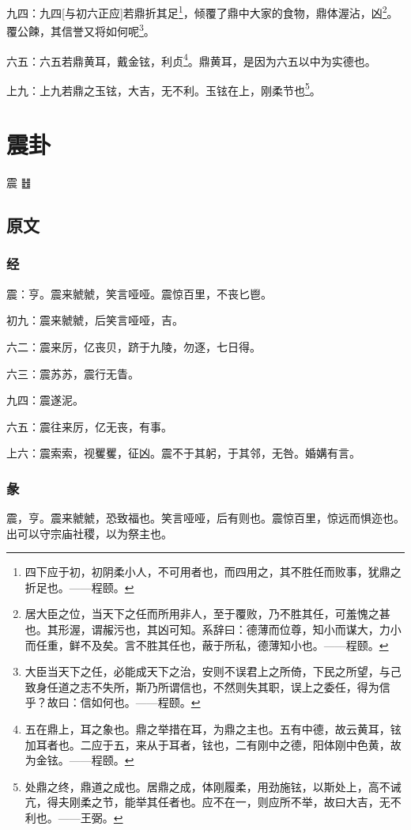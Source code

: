 \documentclass[12pt,oneside]{book}
\begin{document}
九四：九四[与初六正应]若鼎折其足\footnote{四下应于初，初阴柔小人，不可用者也，而四用之，其不胜任而败事，犹鼎之折足也。——程颐。}，倾覆了鼎中大家的食物，鼎体渥沾，凶\footnote{居大臣之位，当天下之任而所用非人，至于覆败，乃不胜其任，可羞愧之甚也。其形渥，谓赧污也，其凶可知。系辞曰：德薄而位尊，知小而谋大，力小而任重，鲜不及矣。言不胜其任也，蔽于所私，德薄知小也。——程颐。}。覆公餗，其信誉又将如何呢\footnote{大臣当天下之任，必能成天下之治，安则不误君上之所倚，下民之所望，与己致身任道之志不失所，斯乃所谓信也，不然则失其职，误上之委任，得为信乎？故曰：信如何也。——程颐。}。

六五：六五若鼎黄耳，戴金铉，利贞\footnote{五在鼎上，耳之象也。鼎之举措在耳，为鼎之主也。五有中德，故云黄耳，铉加耳者也。二应于五，来从于耳者，铉也，二有刚中之德，阳体刚中色黄，故为金铉。——程颐。}。鼎黄耳，是因为六五以中为实德也。

上九：上九若鼎之玉铉，大吉，无不利。玉铉在上，刚柔节也\footnote{处鼎之终，鼎道之成也。居鼎之成，体刚履柔，用劲施铉，以斯处上，高不诫亢，得夫刚柔之节，能举其任者也。应不在一，则应所不举，故曰大吉，无不利也。——王弼。}。




\chapter{震卦}
震 {\large ䷲}
\section{原文}

\subsection{经}
震：亨。震来虩虩，笑言哑哑。震惊百里，不丧匕鬯。

初九：震来虩虩，后笑言哑哑，吉。

六二：震来厉，亿丧贝，跻于九陵，勿逐，七日得。

六三：震苏苏，震行无眚。

九四：震遂泥。

六五：震往来厉，亿无丧，有事。

上六：震索索，视矍矍，征凶。震不于其躬，于其邻，无咎。婚媾有言。

\subsection{彖}
震，亨。震来虩虩，恐致福也。笑言哑哑，后有则也。震惊百里，惊远而惧迩也。 出可以守宗庙社稷，以为祭主也。
\end{document}
